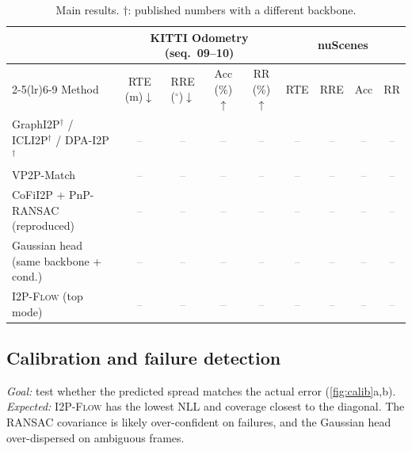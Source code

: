 \documentclass{article}
\newcommand{\method}{\textsc{I2P-Flow}}
\newcommand{\ph}{\textcolor{gray}{--}}   %
\begin{document}
\begin{table}[h]
\centering\scriptsize
\caption{Main results. $\dagger$: published numbers with a different backbone.}
\label{tab:main}
\begin{tabular}{@{}lcccccccc@{}}
\toprule
 & \multicolumn{4}{c}{KITTI Odometry (seq.\ 09--10)} & \multicolumn{4}{c}{nuScenes} \\
\cmidrule(lr){2-5}\cmidrule(lr){6-9}
Method & RTE (m)$\downarrow$ & RRE ($^\circ$)$\downarrow$ & Acc (\%)$\uparrow$ & RR (\%)$\uparrow$ & RTE & RRE & Acc & RR \\
\midrule
GraphI2P$^\dagger$ / ICLI2P$^\dagger$ / DPA-I2P$^\dagger$ & \ph & \ph & \ph & \ph & \ph & \ph & \ph & \ph \\
VP2P-Match & \ph & \ph & \ph & \ph & \ph & \ph & \ph & \ph \\
CoFiI2P + PnP-RANSAC (reproduced) & \ph & \ph & \ph & \ph & \ph & \ph & \ph & \ph \\
Gaussian head (same backbone + cond.) & \ph & \ph & \ph & \ph & \ph & \ph & \ph & \ph \\
\method{} (top mode) & \ph & \ph & \ph & \ph & \ph & \ph & \ph & \ph \\
\bottomrule
\end{tabular}
\end{table}

\subsection{Calibration and failure detection}
\emph{Goal:} test whether the predicted spread matches the actual error (\cref{fig:calib}a,b).
\emph{Expected:} \method{} has the lowest NLL and coverage closest to the diagonal.
The RANSAC covariance is likely over-confident on failures, and the Gaussian head over-dispersed on ambiguous frames.
\end{document}
